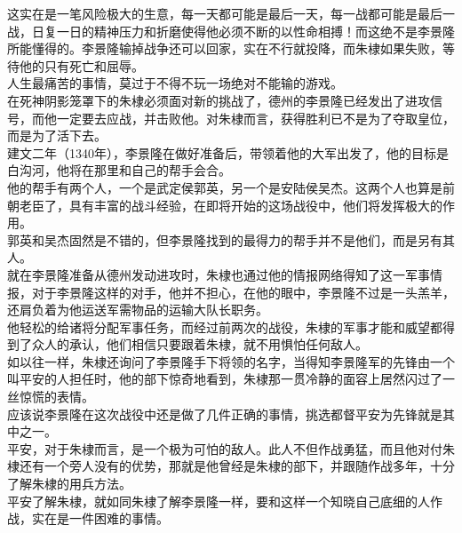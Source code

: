 \begin{multicols}{\theparacolNo}
这实在是一笔风险极大的生意，每一天都可能是最后一天，每一战都可能是最后一战，日复一日的精神压力和折磨使得他必须不断的以性命相搏！而这绝不是李景隆所能懂得的。李景隆输掉战争还可以回家，实在不行就投降，而朱棣如果失败，等待他的只有死亡和屈辱。\\

人生最痛苦的事情，莫过于不得不玩一场绝对不能输的游戏。\\

在死神阴影笼罩下的朱棣必须面对新的挑战了，德州的李景隆已经发出了进攻信号，而他一定要去应战，并击败他。对朱棣而言，获得胜利已不是为了夺取皇位，而是为了活下去。\\

建文二年（1340年），李景隆在做好准备后，带领着他的大军出发了，他的目标是白沟河，他将在那里和自己的帮手会合。\\

他的帮手有两个人，一个是武定侯郭英，另一个是安陆侯吴杰。这两个人也算是前朝老臣了，具有丰富的战斗经验，在即将开始的这场战役中，他们将发挥极大的作用。\\

郭英和吴杰固然是不错的，但李景隆找到的最得力的帮手并不是他们，而是另有其人。\\

就在李景隆准备从德州发动进攻时，朱棣也通过他的情报网络得知了这一军事情报，对于李景隆这样的对手，他并不担心，在他的眼中，李景隆不过是一头羔羊，还肩负着为他运送军需物品的运输大队长职务。\\

他轻松的给诸将分配军事任务，而经过前两次的战役，朱棣的军事才能和威望都得到了众人的承认，他们相信只要跟着朱棣，就不用惧怕任何敌人。\\

如以往一样，朱棣还询问了李景隆手下将领的名字，当得知李景隆军的先锋由一个叫平安的人担任时，他的部下惊奇地看到，朱棣那一贯冷静的面容上居然闪过了一丝惊慌的表情。\\

应该说李景隆在这次战役中还是做了几件正确的事情，挑选都督平安为先锋就是其中之一。\\

平安，对于朱棣而言，是一个极为可怕的敌人。此人不但作战勇猛，而且他对付朱棣还有一个旁人没有的优势，那就是他曾经是朱棣的部下，并跟随作战多年，十分了解朱棣的用兵方法。\\

平安了解朱棣，就如同朱棣了解李景隆一样，要和这样一个知晓自己底细的人作战，实在是一件困难的事情。\\


\end{multicols}
